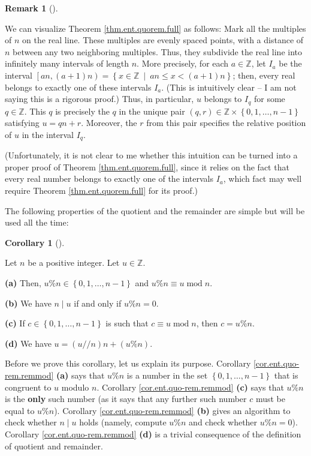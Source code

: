 \documentclass[numbers=enddot,12pt,final,onecolumn,notitlepage]{scrartcl}%
\numberwithin{exer}{subsection}
\theoremstyle{definition}
\newtheorem{remk}[theo]{Remark}
\newenvironment{remark}[1][]
{\begin{remk}[#1]\begin{leftbar}}
{\end{leftbar}\end{remk}}
\newtheorem{coro}[theo]{Corollary}
\newenvironment{corollary}[1][]
{\begin{coro}[#1]\begin{leftbar}}
{\end{leftbar}\end{coro}}
\begin{document}
\begin{remark}
\label{rmk.ent.quo-rem.full.geo}We can visualize Theorem
\ref{thm.ent.quorem.full} as follows: Mark all the multiples of $n$ on the
real line. These multiples are evenly spaced points, with a distance of $n$
between any two neighboring multiples. Thus, they subdivide the real line into
infinitely many intervals of length $n$. More precisely, for each
$a\in\mathbb{Z}$, let $I_{a}$ be the interval $\left[  an,\left(  a+1\right)
n\right)  =\left\{  x\in\mathbb{Z}\ \mid\ an\leq x<\left(  a+1\right)
n\right\}  $; then, every real belongs to exactly one of these intervals
$I_{a}$. (This is intuitively clear -- I am not saying this is a rigorous
proof.) Thus, in particular, $u$ belongs to $I_{q}$ for some $q\in\mathbb{Z}$.
This $q$ is precisely the $q$ in the unique pair $\left(  q,r\right)
\in\mathbb{Z}\times\left\{  0,1,\ldots,n-1\right\}  $ satisfying $u=qn+r$.
Moreover, the $r$ from this pair specifies the relative position of $u$ in the
interval $I_{q}$.

(Unfortunately, it is not clear to me whether this intuition can be turned
into a proper proof of Theorem \ref{thm.ent.quorem.full}, since it relies on
the fact that every real number belongs to exactly one of the intervals
$I_{a}$, which fact may well require Theorem \ref{thm.ent.quorem.full} for its proof.)
\end{remark}

The following properties of the quotient and the remainder are simple but will
be used all the time:

\begin{corollary}
\label{cor.ent.quo-rem.remmod}Let $n$ be a positive integer. Let
$u\in\mathbb{Z}$.

\textbf{(a)} Then, $u\%n\in\left\{  0,1,\ldots,n-1\right\}  $ and $u\%n\equiv
u\operatorname{mod}n$.

\textbf{(b)} We have $n\mid u$ if and only if $u\%n=0$.

\textbf{(c)} If $c\in\left\{  0,1,\ldots,n-1\right\}  $ is such that $c\equiv
u\operatorname{mod}n$, then $c=u\%n$.

\textbf{(d)} We have $u=\left(  u//n\right)  n+\left(  u\%n\right)  $.
\end{corollary}

Before we prove this corollary, let us explain its purpose. Corollary
\ref{cor.ent.quo-rem.remmod} \textbf{(a)} says that $u\%n$ is a number in the
set $\left\{  0,1,\ldots,n-1\right\}  $ that is congruent to $u$ modulo $n$.
Corollary \ref{cor.ent.quo-rem.remmod} \textbf{(c)} says that $u\%n$ is the
\textbf{only} such number (as it says that any further such number $c$ must be
equal to $u\%n$). Corollary \ref{cor.ent.quo-rem.remmod} \textbf{(b)} gives an
algorithm to check whether $n\mid u$ holds (namely, compute $u\%n$ and check
whether $u\%n=0$). Corollary \ref{cor.ent.quo-rem.remmod} \textbf{(d)} is a
trivial consequence of the definition of quotient and remainder.
\end{document}
